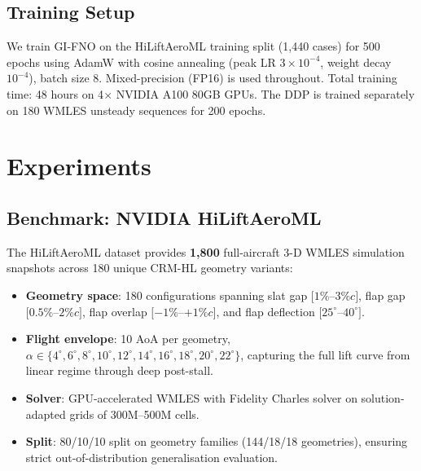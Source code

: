 \documentclass[10pt,twocolumn,letterpaper]{article}
\begin{document}
\subsection{Training Setup}
\label{subsec:training}

We train GI-FNO on the HiLiftAeroML training split (1,440 cases) for
500 epochs using AdamW \cite{Loshchilov2017AdamW} with cosine
annealing (peak LR $3\times10^{-4}$, weight decay $10^{-4}$), batch
size 8. Mixed-precision (FP16) is used throughout. Total training time:
48 hours on 4$\times$ NVIDIA A100 80GB GPUs. The DDP is trained
separately on 180 WMLES unsteady sequences for 200 epochs.

\section{Experiments}
\label{sec:experiments}

\subsection{Benchmark: NVIDIA HiLiftAeroML}
\label{subsec:dataset}

The HiLiftAeroML dataset \cite{NVIDIA2026HiLift} provides
\textbf{1,800} full-aircraft 3-D WMLES simulation snapshots across
180 unique CRM-HL geometry variants:
\begin{itemize}
  \item \textbf{Geometry space}: 180 configurations spanning slat gap
        $[1\%$--$3\% c]$, flap gap $[0.5\%$--$2\% c]$, flap overlap
        $[-1\%$--$+1\% c]$, and flap deflection $[25^\circ$--$40^\circ]$.
  \item \textbf{Flight envelope}: 10 AoA per geometry,
        $\alpha \in \{4^\circ, 6^\circ, 8^\circ, 10^\circ, 12^\circ,
        14^\circ, 16^\circ, 18^\circ, 20^\circ, 22^\circ\}$, capturing
        the full lift curve from linear regime through deep post-stall.
  \item \textbf{Solver}: GPU-accelerated WMLES with Fidelity Charles
        solver \cite{FidelityCharles2024} on solution-adapted grids of
        300M–500M cells.
  \item \textbf{Split}: 80/10/10 split on geometry families
        (144/18/18 geometries), ensuring strict out-of-distribution
        generalisation evaluation.
\end{itemize}
\end{document}
